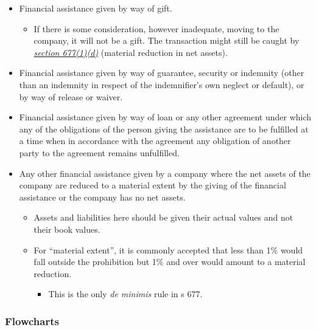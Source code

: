 \documentclass[
]{article}
\providecommand{\tightlist}{%
  \setlength{\itemsep}{0pt}\setlength{\parskip}{0pt}}
\begin{document}
\begin{itemize}
\tightlist
\item
  Financial assistance given by way of gift.

  \begin{itemize}
  \tightlist
  \item
    If there is some consideration, however inadequate, moving to the
    company, it will not be a gift. The transaction might still be
    caught by
    \emph{\href{https://uk.westlaw.com/8-505-7474?originationContext=document\&transitionType=PLDocumentLink\&contextData=(sc.Default)\&ppcid=52c063520c5f48d8a198d13504dc80c1}{section
    677(1)(d)}} (material reduction in net assets).
  \end{itemize}
\item
  Financial assistance given by way of guarantee, security or indemnity
  (other than an indemnity in respect of the indemnifier's own neglect
  or default), or by way of release or waiver.
\item
  Financial assistance given by way of loan or any other agreement under
  which any of the obligations of the person giving the assistance are
  to be fulfilled at a time when in accordance with the agreement any
  obligation of another party to the agreement remains unfulfilled.
\item
  Any other financial assistance given by a company where the net assets
  of the company are reduced to a material extent by the giving of the
  financial assistance or the company has no net assets.

  \begin{itemize}
  \tightlist
  \item
    Assets and liabilities here should be given their actual values and
    not their book values.
  \item
    For ``material extent'', it is commonly accepted that less than 1\%
    would fall outside the prohibition but 1\% and over would amount to
    a material reduction.

    \begin{itemize}
    \tightlist
    \item
      This is the only \emph{de minimis} rule in s 677.
    \end{itemize}
  \end{itemize}
\end{itemize}

\hypertarget{flowcharts}{%
\subsubsection{Flowcharts}\label{flowcharts}}
\end{document}
